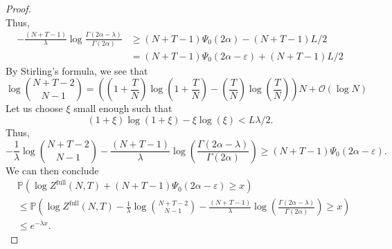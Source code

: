 \documentclass[11pt]{article}
\theoremstyle{definition}
\newcommand{\Prob}{\mathbb{P}}
\newcommand{\Zfull}{Z^{\mathrm{full}}}
\begin{document}
\begin{proof}
\[\]
Thus,
\[
\begin{aligned}
 -\frac{(N+T-1)}{\lambda}\log\frac{\Gamma(2\alpha - \lambda)}{\Gamma(2\alpha)} &\geq (N+T-1)\Psi_0(2\alpha) - (N+T-1)L/2\\
&= (N+T-1)\Psi_0(2\alpha-\varepsilon) + (N+T-1)L/2
\end{aligned}
\]
By Stirling's formula, we see that
\[
\log \binom{N+T-2}{N-1} =\left( \left(1+\frac{T}{N}\right)\log \left(1+\frac{T}{N}\right) -  \left(\frac{T}{N}\right)\log\left(\frac{T}{N}\right) \right) N + \mathcal{O}(\log N)
\]
Let us choose $\xi$ small enough such that 
\[
(1+\xi)\log(1+\xi)-\xi\log(\xi) < L\lambda/2.
\]
Thus, 
\[
- \frac{1}{\lambda} \log \binom{N+T-2}{N-1}-\frac{(N+T-1)}{\lambda} \log \left(\frac{\Gamma(2\alpha - \lambda)}{\Gamma(2\alpha)} \right) \geq (N+T-1)\Psi_0(2\alpha-\varepsilon).
\] 
We can then conclude
\[
\begin{split}
&\Prob\left( \log \Zfull(N,T) +(N+T-1)\Psi_0(2\alpha-\varepsilon) \geq x \right)\\
    &\leq \Prob\left( \log \Zfull(N,T) - \frac{1}{\lambda} \log \binom{N+T-2}{N-1} -\frac{(N+T-1)}{\lambda} \log \left(\frac{\Gamma(2\alpha - \lambda)}{\Gamma(2\alpha)} \right) \geq x \right)\\
    &\leq e^{-\lambda x}.
\end{split}
\]
\end{proof}
\end{document}
